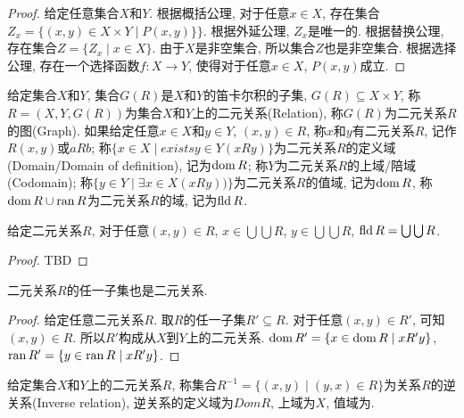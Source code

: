 \begin{proof}
	给定任意集合$X$和$Y$. 根据概括公理, 对于任意$x\in X$, 存在集合$Z_x=\{(x,y)\in X\times Y\mid P(x,y)\}\}$. 根据外延公理, $Z_x$是唯一的. 根据替换公理, 存在集合$Z=\{Z_x\mid x\in X\}$. 由于$X$是非空集合, 所以集合$Z$也是非空集合. 根据选择公理, 存在一个选择函数$f\colon X\rightarrow Y$, 使得对于任意$x\in X$, $P(x,y)$成立.
\end{proof}

\begin{definition}[二元关系]
	给定集合$X$和$Y$, 集合$G(R)$是$X$和$Y$的笛卡尔积的子集, $G(R)\subseteq X\times Y$, 称$R=(X,Y,G(R))$为集合$X$和$Y$上的二元关系(Relation), 称$G(R)$为二元关系$R$的图(Graph). 如果给定任意$x\in X$和$y\in Y$, $(x,y)\in R$, 称$x$和$y$有二元关系$R$, 记作$R(x,y)$或$aRb$; 称$\{x\in X\mid exists y\in Y(xRy)\}$为二元关系$R$的定义域(Domain/Domain of definition), 记为$\operatorname{dom} R$; 称$Y$为二元关系$R$的上域/陪域(Codomain); 称$\{y\in Y\mid \exists x\in X(xRy))\}$为二元关系$R$的值域, 记为$\operatorname{dom} R$, 称$\operatorname{dom} R\cup \operatorname{ran} R$为二元关系$R$的域, 记为$\operatorname{fld} R$.
\end{definition}

\begin{proposition}
	给定二元关系$R$, 对于任意$(x,y)\in R$, $x\in \bigcup \bigcup R$, $y\in \bigcup \bigcup R$, $\operatorname{fld} R=\bigcup \bigcup R$.
\end{proposition}

\begin{proof}
	TBD
\end{proof}

\begin{corollary}
	二元关系$R$的任一子集也是二元关系.
\end{corollary}

\begin{proof}
	给定任意二元关系$R$. 取$R$的任一子集$R'\subseteq R$. 对于任意$(x,y)\in R'$, 可知$(x,y)\in R$. 所以$R'$构成从$X$到$Y$上的二元关系. $\operatorname{dom} R'=\{x\in \operatorname{dom} R\mid xR'y\}$, $\operatorname{ran} R'=\{y\in \operatorname{ran} R\mid xR'y\}$.
\end{proof}

\begin{definition}[逆关系]
	给定集合$X$和$Y$上的二元关系$R$, 称集合$R^{-1}=\{(x,y)\mid (y,x)\in R\}$为关系$R$的逆关系(Inverse relation), 逆关系的定义域为$Dom R$, 上域为$X$, 值域为.
\end{definition}

